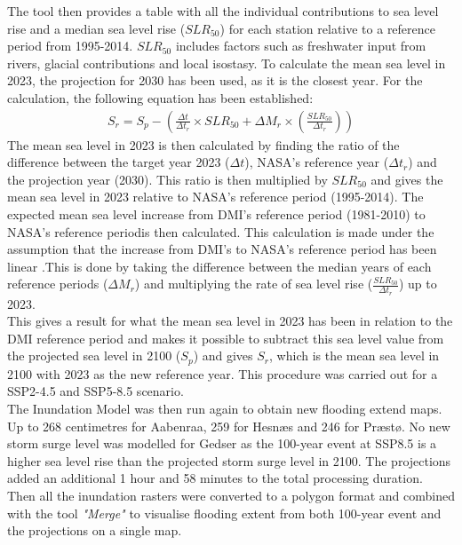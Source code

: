 The tool then provides a table with all the individual contributions to sea level rise and a median sea level rise ($SLR_{50}$) for each station relative to a reference period from 1995-2014. $SLR_{50}$ includes factors such as freshwater input from rivers, glacial contributions and local isostasy. To calculate the mean sea level in 2023, the projection for 2030 has been used, as it is the closest year. For the calculation, the following equation has been established:
\begin{align} \label{Equation: Vandstandsstigning calculation}
	S_r = S_p- \left( \frac{\Delta{t}}{\Delta{t_r}}\times SLR_{50} + \Delta{M_r} \times \left(\frac{SLR_{50}}{\Delta{t_r}}\right) \right)
\end{align}
The mean sea level in 2023 is then calculated by finding the ratio of the difference between the target year 2023 ($\Delta{t}$), NASA's reference year ($\Delta{t_r}$) and the projection year (2030). This ratio is then multiplied by $SLR_{50}$ and gives the mean sea level in 2023 relative to NASA's reference period (1995-2014). The expected mean sea level increase from DMI's reference period (1981-2010) to NASA's reference periodis then calculated. This calculation is made under the assumption that the increase from DMI's to NASA's reference period has been linear \citep{danish_meteorological_institute_dmi_2024}.This is done by taking the difference between the median years of each reference periods ($\Delta{M_r}$) and multiplying the rate of sea level rise ($\frac{SLR_{50}}{\Delta{t_r}}$) up to 2023.\\
This gives a result for what the mean sea level in 2023 has been in relation to the DMI reference period and makes it possible to subtract this sea level value from the projected sea level in 2100 ($S_p$) and gives $S_r$, which is the mean sea level in 2100 with 2023 as the new reference year. This procedure was carried out for a SSP2-4.5 and SSP5-8.5 scenario.\\

The Inundation Model was then run again to obtain new flooding extend maps. Up to 268 centimetres for Aabenraa, 259 for Hesnæs and 246 for Præstø. No new storm surge level was modelled for Gedser as the 100-year event at SSP8.5 is a higher sea level rise than the projected storm surge level in 2100. The projections added an additional 1 hour and 58 minutes to the total processing duration.\\

Then all the inundation rasters were converted to a polygon format and combined with the tool \textit{"Merge"} to visualise flooding extent from both 100-year event and the projections on a single map.
